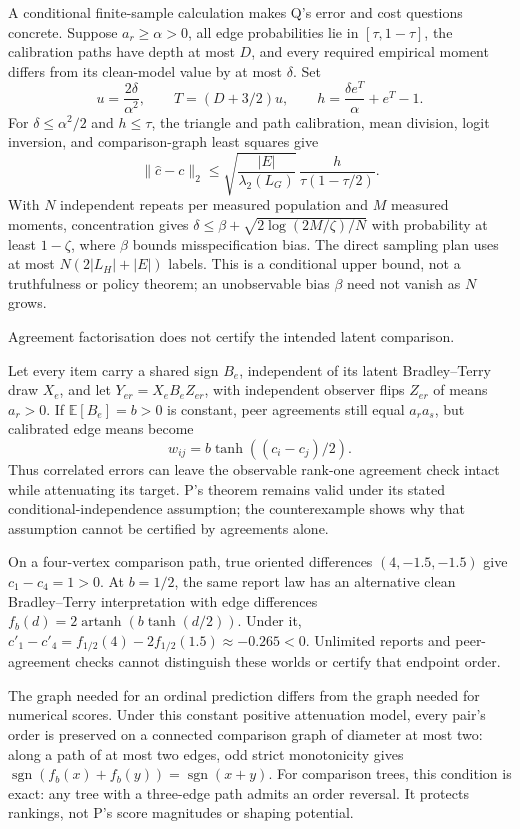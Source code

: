 \documentclass{article}
\begin{document}
A conditional finite-sample calculation makes Q's error and cost questions concrete. Suppose \(a_r\geq\alpha>0\), all edge probabilities lie in \([\tau,1-\tau]\), the calibration paths have depth at most \(D\), and every required empirical moment differs from its clean-model value by at most \(\delta\). Set
\[
u=\frac{2\delta}{\alpha^2},\qquad
T=(D+3/2)u,\qquad
h=\frac{\delta e^T}{\alpha}+e^T-1.
\]
For \(\delta\leq\alpha^2/2\) and \(h\leq\tau\), the triangle and path calibration, mean division, logit inversion, and comparison-graph least squares give
\[
\|\widehat c-c\|_2
\leq
\sqrt{\frac{|E|}{\lambda_2(L_G)}}\,
\frac{h}{\tau(1-\tau/2)}.
\]
With \(N\) independent repeats per measured population and \(M\) measured moments, concentration gives
\(\delta\leq\beta+\sqrt{2\log(2M/\zeta)/N}\) with probability at least \(1-\zeta\), where \(\beta\) bounds misspecification bias. The direct sampling plan uses at most \(N(2|L_H|+|E|)\) labels. This is a conditional upper bound, not a truthfulness or policy theorem; an unobservable bias \(\beta\) need not vanish as \(N\) grows. 

\begin{objection}
Agreement factorisation does not certify the intended latent comparison.
\end{objection}

Let every item carry a shared sign \(B_e\), independent of its latent Bradley--Terry draw \(X_e\), and let \(Y_{er}=X_eB_eZ_{er}\), with independent observer flips \(Z_{er}\) of means \(a_r>0\). If \(\mathbb{E}[B_e]=b>0\) is constant, peer agreements still equal \(a_ra_s\), but calibrated edge means become
\[
w_{ij}=b\tanh((c_i-c_j)/2).
\]
Thus correlated errors can leave the observable rank-one agreement check intact while attenuating its target. P's theorem remains valid under its stated conditional-independence assumption; the counterexample shows why that assumption cannot be certified by agreements alone. 

On a four-vertex comparison path, true oriented differences \((4,-1.5,-1.5)\) give \(c_1-c_4=1>0\). At \(b=1/2\), the same report law has an alternative clean Bradley--Terry interpretation with edge differences
\(f_b(d)=2\operatorname{artanh}(b\tanh(d/2))\).
Under it, \(c'_1-c'_4=f_{1/2}(4)-2f_{1/2}(1.5)\approx-0.265<0\). Unlimited reports and peer-agreement checks cannot distinguish these worlds or certify that endpoint order. 

The graph needed for an ordinal prediction differs from the graph needed for numerical scores. Under this constant positive attenuation model, every pair's order is preserved on a connected comparison graph of diameter at most two: along a path of at most two edges, odd strict monotonicity gives
\(\operatorname{sgn}(f_b(x)+f_b(y))
=\operatorname{sgn}(x+y)\).
For comparison trees, this condition is exact: any tree with a three-edge path admits an order reversal. It protects rankings, not P's score magnitudes or shaping potential. 
\end{document}
